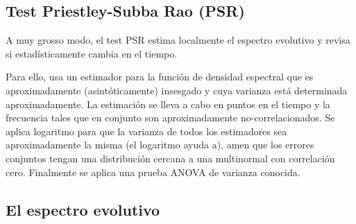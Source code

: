 
%
%
%
%
%



\subsection{Test Priestley-Subba Rao (PSR)}


A muy grosso modo, el test PSR estima localmente  el espectro evolutivo
 y revisa si estad\'isticamente
cambia en el tiempo.

Para ello, usa un estimador para la funci\'on de densidad espectral
que es aproximadamente (asint\'oticamente) insesgado y cuya varianza est\'a
determinada aproximadamente. La estimaci\'on se lleva a cabo en puntos en el tiempo y
la frecuencia tales que en conjunto son aproximadamente no-correlacionados.
Se aplica logaritmo para que la varianza de todos los estimadores sea aproximadamente
la misma (el logaritmo ayuda a), amen que los errores conjuntos tengan una
distribuci\'on cercana a una multinormal con correlaci\'on cero.
Finalmente se aplica una prueba ANOVA de varianza conocida.


\subsection{El espectro evolutivo}

